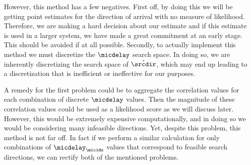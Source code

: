 \documentclass{uiucecethesis09}
\begin{document}
      However, this method has a few negatives. First off, by doing this we will 
      be getting point estimates for the direction of arrival with no measure of 
      likelihood. Therefore, we are making a hard decision about our estimate and 
      if this estimate is used in a larger system, we have made a great 
      commitment at an early stage. This should be avoided if at all possible.  
      Secondly, to actually implement this method we must discretize the 
      $\micdelay$ search space. In doing so, we are inherently discretizing the 
      search space of $\hat{\srcdir}$, which may end up leading to a 
      discretization that is inefficient or ineffective for our purposes.

      A remedy for the first problem could be to aggregate the correlation 
      values for each combination of discrete $\micdelay$ values. Then the 
      magnitude of these correlation values could be used as a likelihood score 
      as we will discuss later.  However, this would be extremely expensive 
      computationally, and in doing so we would be considering many infeasible 
      directions.  Yet, despite this problem, this method is not far off.  In 
      fact if we perform a similar calculation for only combinations of 
      $\micdelay_\micidx$ values that correspond to feasible search directions, 
      we can rectify both of the mentioned problems.
\end{document}
